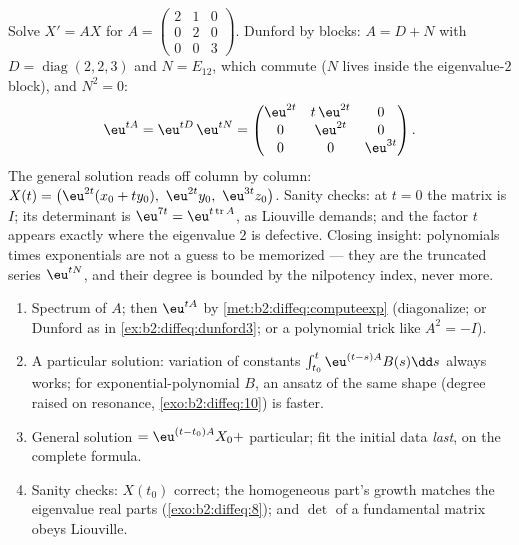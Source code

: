 \begin{example}\label{ex:b2:diffeq:dunford3}
Solve $X' = AX$ for $A = \begin{pmatrix} 2 & 1 & 0\\ 0 & 2 &
0\\ 0 & 0 & 3\end{pmatrix}$. Dunford by blocks: $A = D + N$
with $D = \operatorname{diag}(2, 2, 3)$ and $N = E_{12}$, which
commute ($N$ lives inside the eigenvalue-$2$ block), and $N^2 =
0$:
\[
\eu^{tA} = \eu^{tD}\,\eu^{tN}
= \begin{pmatrix}
\eu^{2t} & t\,\eu^{2t} & 0\\
0 & \eu^{2t} & 0\\
0 & 0 & \eu^{3t}
\end{pmatrix} .
\]
The general solution reads off column by column: $X(t) =
\bigl(\eu^{2t}(x_0 + ty_0),\ \eu^{2t}y_0,\
\eu^{3t}z_0\bigr)$. Sanity checks: at $t = 0$ the matrix is
$I$; its determinant is $\eu^{7t} =
\eu^{t\operatorname{tr}A}$, as Liouville demands; and the
factor $t$ appears exactly where the eigenvalue $2$ is
defective. Closing insight: polynomials times exponentials are
not a guess to be memorized --- they are the truncated series
$\eu^{tN}$, and their degree is bounded by the nilpotency
index, never more.
\end{example}

\begin{method}[Solving $X' = AX + B(t)$, start to finish]\label{met:b2:diffeq:solvelinear}
\begin{enumerate}
  \item Spectrum of $A$; then $\eu^{tA}$ by
        \cref{met:b2:diffeq:computeexp} (diagonalize; or
        Dunford as in \cref{ex:b2:diffeq:dunford3}; or a
        polynomial trick like $A^2 = -I$).
  \item A particular solution: variation of constants
        $\int_{t_0}^t\eu^{(t-s)A}B(s)\dd s$ always works;
        for exponential-polynomial $B$, an ansatz of the same
        shape (degree raised on resonance,
        \cref{exo:b2:diffeq:10}) is faster.
  \item General solution $= \eu^{(t-t_0)A}X_0 +$ particular;
        fit the initial data \emph{last}, on the complete
        formula.
  \item Sanity checks: $X(t_0)$ correct; the homogeneous part's
        growth matches the eigenvalue real parts
        (\cref{exo:b2:diffeq:8}); and $\det$ of a fundamental
        matrix obeys Liouville.
\end{enumerate}
\end{method}

